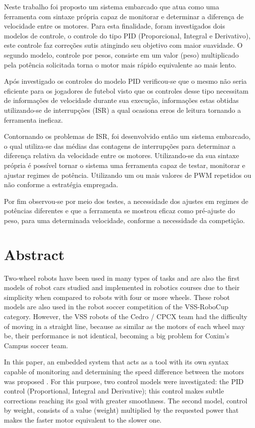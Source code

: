 \documentclass[a4paper,12pt,portuguese]{ufms-cpcx}
\begin{document}
Neste trabalho foi proposto um sistema embarcado que atua como uma ferramenta com sintaxe própria capaz de monitorar e determinar a diferença de velocidade entre os motores. 
Para esta finalidade, foram investigados dois modelos de controle, o controle do tipo PID (Proporcional, Integral e Derivativo), este controle faz correções sutis atingindo seu objetivo com maior suavidade. O segundo modelo, controle por pesos, consiste em um valor (peso) multiplicado pela potência solicitada torna o motor mais rápido equivalente ao mais lento.

Após investigado os controles do modelo PID verificou-se que o mesmo não seria eficiente para os jogadores de futebol visto que os controles desse tipo necessitam de informações de velocidade durante sua execução, informações estas obtidas utilizando-se de interrupções (ISR) a qual ocasiona erros de leitura tornando a ferramenta ineficaz.

Contornando os problemas de ISR, foi desenvolvido então um sistema embarcado, o qual utiliza-se das médias das contagens de interrupções para determinar a diferença relativa da velocidade entre os motores. Utilizando-se da sua sintaxe própria é possível tornar o sistema uma ferramenta capaz de testar, monitorar e ajustar regimes de potência. Utilizando um ou mais valores de PWM repetidos ou não conforme a estratégia empregada.

Por fim observou-se por meio dos testes, a necessidade dos ajustes em regimes de potências diferentes e que a ferramenta se mostrou eficaz como pré-ajuste do peso, para uma determinada velocidade, conforme a necessidade da competição.



\chapter*{Abstract}
\thispagestyle{empty}
Two-wheel robots have been used in many types of tasks and are also the first models of robot cars studied and implemented in robotics courses due to their simplicity when compared to robots with four or more wheels. These robot models are also used in the robot soccer competition of the VSS-RoboCup category. However, the VSS robots of the Cedro / CPCX team had the difficulty of moving in a straight line, because as similar as the motors of each wheel may be, their performance is not identical, becoming a big problem for Coxim's Campus soccer team.

In this paper, an embedded system that acts as a tool with its own syntax capable of monitoring and determining the speed difference between the motors was proposed .
For this purpose, two control models were investigated: the PID control (Proportional, Integral and Derivative); this control makes subtle corrections reaching its goal with greater smoothness. The second model, control by weight, consists of a value (weight) multiplied by the requested power that makes the faster motor equivalent to the slower one.
\end{document}
